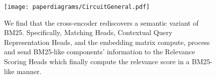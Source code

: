 \begin{figure}[H]
    \centering
    \texttt{[image: paperdiagrams/CircuitGeneral.pdf]}
    \caption{We find that the cross-encoder rediscovers a semantic variant of BM25. Specifically, Matching Heads, Contextual Query Representation Heads, and the embedding matrix compute, process and send BM25-like components' information to the Relevance Scoring Heads which finally compute the relevance score in a BM25-like manner.  %
    }
    \label{fig:CircuitGeneral}
    \label{fig:your_label}
\end{figure}
